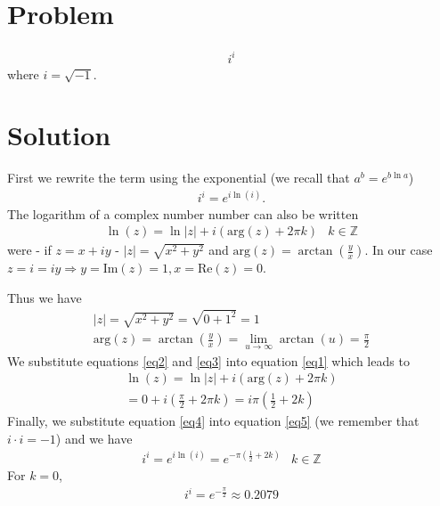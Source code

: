 \documentclass[a4paper]{article}
\title{}
\author{Johan Boissard}
\date\today
\begin{document}
\section{Problem}

\begin{eqnarray}
	i^i
\end{eqnarray}
where $i=\sqrt{-1}$.

\section{Solution}
First we rewrite the term using the exponential (we recall that $a^b=e^{b\ln{a}}$)
\begin{eqnarray}
	\label{eq5}i^i=e^{i\ln{(i)}}.
\end{eqnarray}
The logarithm of a complex number number can also be written
\begin{eqnarray}
	\label{eq1}\ln{(z)}=\ln{|z|}+i(\mathrm{arg}(z)+2\pi k)&k\in\mathbb Z
\end{eqnarray}
were - if $z=x+iy$ - $|z|=\sqrt{x^2+y^2}$ and $\mathrm{arg}(z)=\arctan(\frac{y}{x})$. In our case $z=i=iy \Rightarrow y=\mathrm{Im}(z)=1, x=\mathrm{Re}(z)=0$.

Thus we have
\begin{eqnarray}
	\label{eq2}|z|=\sqrt{x^2+y^2}=\sqrt{0+1^2}=1
	\\
	\label{eq3}\mathrm{arg}(z)=\arctan(\frac{y}{x})=\lim_{u\rightarrow\infty}\arctan(u)=\frac{\pi}{2}
\end{eqnarray}
We substitute equations \ref{eq2} and \ref{eq3} into equation \ref{eq1} which leads to
\begin{eqnarray}
	\label{eq8}\ln{(z)}=\ln{|z|}+i(\mathrm{arg}(z)+2\pi k)
	\\
	\label{eq4}=0+i(\frac{\pi}{2}+2\pi k)=i\pi(\frac{1}{2}+2k)
\end{eqnarray}
Finally, we substitute equation \ref{eq4} into equation \ref{eq5} (we remember that $i\cdot i=-1$) and we have
\begin{eqnarray}
	i^i=e^{i\ln{(i)}}=e^{-\pi(\frac{1}{2}+2k)}&k\in\mathbb Z
\end{eqnarray}
For $k=0$, 
\begin{eqnarray}
	i^i=e^{-\frac{\pi}{2}}\approx 0.2079
\end{eqnarray}
\end{document}
